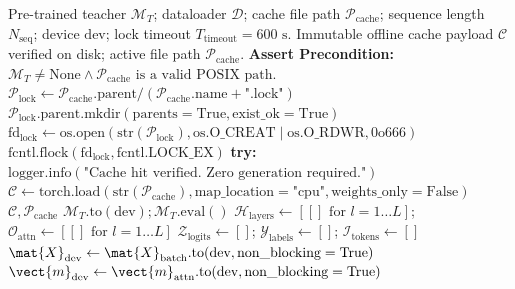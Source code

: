 \begin{algorithm}[H]
\caption[AOT Offline Teacher Representation Caching with POSIX Advisory Locking]{AOT Offline Teacher Representation Caching with POSIX Advisory Locking}
\label{alg:teacher_cache_posix}
\begin{algorithmic}[1]
\REQUIRE Pre-trained teacher $\mathcal{M}_T$; dataloader $\mathcal{D}$; cache file path $\mathcal{P}_{\text{cache}}$; sequence length $N_{\text{seq}}$; device $\text{dev}$; lock timeout $T_{\text{timeout}} = 600\text{ s}$.
\ENSURE Immutable offline cache payload $\mathcal{C}$ verified on disk; active file path $\mathcal{P}_{\text{cache}}$.
\STATE \textbf{Assert Precondition:} $\mathcal{M}_T \ne \text{None} \land \mathcal{P}_{\text{cache}} \text{ is a valid POSIX path}$.
\STATE $\mathcal{P}_{\text{lock}} \leftarrow \mathcal{P}_{\text{cache}}.\text{parent} / (\mathcal{P}_{\text{cache}}.\text{name} + \text{".lock"})$
\STATE $\mathcal{P}_{\text{lock}}.\text{parent}.\text{mkdir}(\text{parents}=\text{True}, \text{exist\_ok}=\text{True})$
\STATE $\text{fd}_{\text{lock}} \leftarrow \text{os.open}(\text{str}(\mathcal{P}_{\text{lock}}), \text{os.O\_CREAT} \mid \text{os.O\_RDWR}, 0\text{o666})$
\STATE {}
\STATE $\text{fcntl.flock}(\text{fd}_{\text{lock}}, \text{fcntl.LOCK\_EX})$ 
\STATE \textbf{try:}
    \STATE {}
        \STATE $\text{logger.info}(\text{"Cache hit verified. Zero generation required."})$
        \STATE $\mathcal{C} \leftarrow \text{torch.load}(\text{str}(\mathcal{P}_{\text{cache}}), \text{map\_location}=\text{"cpu"}, \text{weights\_only}=\text{False})$
        \STATE \RETURN $\mathcal{C}, \mathcal{P}_{\text{cache}}$
    \ENDIF
    \STATE {}
    \STATE $\mathcal{M}_T.\text{to}(\text{dev}); \mathcal{M}_T.\text{eval}()$
    \STATE $\mathcal{H}_{\text{layers}} \leftarrow [[] \text{ for } l = 1 \dots L]$; $\mathcal{O}_{\text{attn}} \leftarrow [[] \text{ for } l = 1 \dots L]$
    \STATE $\mathcal{Z}_{\text{logits}} \leftarrow []$; $\mathcal{Y}_{\text{labels}} \leftarrow []$; $\mathcal{I}_{\text{tokens}} \leftarrow []$
        \STATE $\mat{X}_{\text{dev}} \leftarrow \mat{X}_{\text{batch}}.\text{to}(\text{dev}, \text{non\_blocking}=\text{True})$
        \STATE $\vect{m}_{\text{dev}} \leftarrow \vect{m}_{\text{attn}}.\text{to}(\text{dev}, \text{non\_blocking}=\text{True})$

\end{algorithmic}
\end{algorithm}
